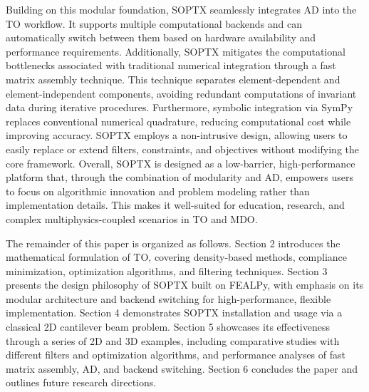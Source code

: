 \documentclass[mathpazo]{cicp}
\begin{document}
Building on this modular foundation, SOPTX seamlessly integrates AD into the TO workflow. It supports multiple computational backends and can automatically switch between them based on hardware availability and performance requirements. Additionally, SOPTX mitigates the computational bottlenecks associated with traditional numerical integration through a fast matrix assembly technique. This technique separates element-dependent and element-independent components, avoiding redundant computations of invariant data during iterative procedures. Furthermore, symbolic integration via SymPy~\cite{unknown} replaces conventional numerical quadrature, reducing computational cost while improving accuracy. SOPTX employs a non-intrusive design, allowing users to easily replace or extend filters, constraints, and objectives without modifying the core framework. Overall, SOPTX is designed as a low-barrier, high-performance platform that, through the combination of modularity and AD, empowers users to focus on algorithmic innovation and problem modeling rather than implementation details. This makes it well-suited for education, research, and complex multiphysics-coupled scenarios in TO and MDO.

The remainder of this paper is organized as follows. Section 2 introduces the mathematical formulation of TO, covering density-based methods, compliance minimization, optimization algorithms, and filtering techniques. Section 3 presents the design philosophy of SOPTX built on FEALPy, with emphasis on its modular architecture and backend switching for high-performance, flexible implementation. Section 4 demonstrates SOPTX installation and usage via a classical 2D cantilever beam problem. Section 5 showcases its effectiveness through a series of 2D and 3D examples, including comparative studies with different filters and optimization algorithms, and performance analyses of fast matrix assembly, AD, and backend switching. Section 6 concludes the paper and outlines future research directions.
\end{document}
